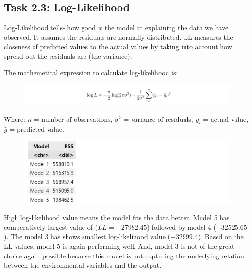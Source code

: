 \documentclass[12pt,a4paper]{article}
\begin{document}

\subsection*{Task 2.3: Log-Likelihood}

Log-Likelihood tells- 
how good is the model at explaining the 
data we have observed. It assumes the residuals are 
normally distributed. 
LL measures the closeness of predicted values to  
the actual values by taking into account how spread 
out the residuals are (the variance). 

The mathemetical expression to calculate log-likelihood is: 


\begin{figure}[H]
  \centering
  \includegraphics[width=\textwidth]{p5.png}
\end{figure}

Where: $n$ = number of observations, $\sigma^2 $ = variance of residuals,  
$y_i$ = actual value,  $\hat{y}$ = predicted value. 


\begin{figure}[H]
  \centering
  \includegraphics[width=\textwidth]{m5.png}
\end{figure}

High log-likelihood value means the model fits the data better. Model 5 has comperatively largest  
value of ($LL= -27982.45$) followed by model 4	($-32525.65$). The model 3 has shows smallest
log-likelihood value ($-32999.4$). Based on the LL-values, model 5 is again performing well. And, 
model 3 is not of the great choice again possible because this model is 
not capturing the underlying relation between the environmental variables 
and the output.  
\end{document}
